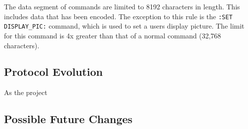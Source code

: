 The data segment of commands are limited to 8192 characters in length. This includes data that has been encoded. The exception to this rule is the \texttt{:SET DISPLAY\_PIC:} command, which is used to set a users display picture. The limit for this command is 4x greater than that of a normal command (32,768 characters).


\subsection{Protocol Evolution}

As the project 


\subsection{Possible Future Changes}




